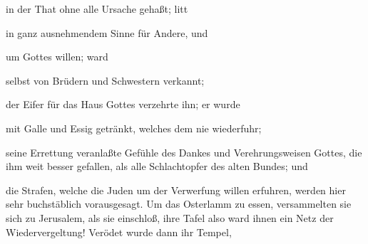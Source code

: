 \begin{aufzb}
\item in der That ohne alle Ursache gehaßt; litt
\item in ganz ausnehmendem Sinne für Andere, und
\item um Gottes willen; ward
\item selbst von Brüdern und Schwestern verkannt;
\item der Eifer für das Haus Gottes verzehrte ihn; er wurde
\item mit Galle und Essig getränkt, welches dem  nie wiederfuhr;
\item seine Errettung veranlaßte Gefühle des Dankes und Verehrungsweisen Gottes, die ihm weit besser gefallen, als alle Schlachtopfer des alten Bundes; und
\item die Strafen, welche die Juden um der Verwerfung  willen erfuhren, werden hier sehr buchstäblich vorausgesagt. Um das Osterlamm zu essen, versammelten sie sich zu Jerusalem, als  sie einschloß, ihre Tafel also ward ihnen ein Netz der Wiedervergeltung! Verödet wurde dann ihr Tempel, \usw\
\end{aufzb}

